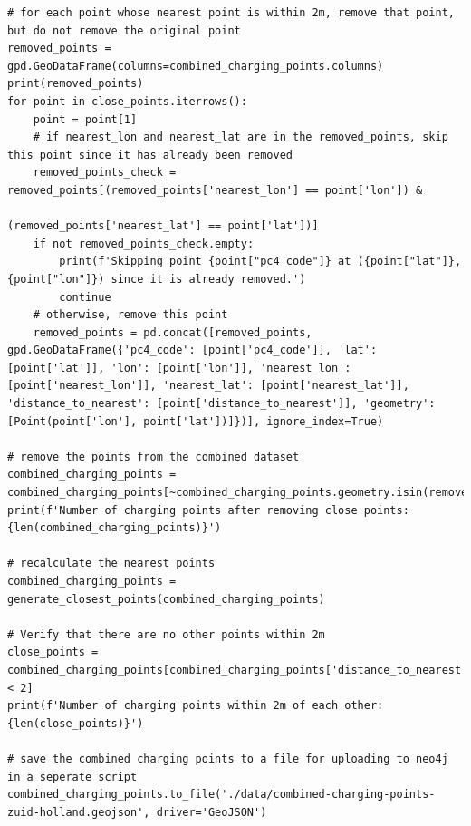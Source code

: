 \documentclass{article}
\begin{document}
\begin{lstlisting}[style=pythonStyle,caption={Code for data exchange between OSM and OCM}, label={lst:data_exchange}]
# for each point whose nearest point is within 2m, remove that point, but do not remove the original point
removed_points = gpd.GeoDataFrame(columns=combined_charging_points.columns)
print(removed_points)
for point in close_points.iterrows():
    point = point[1]
    # if nearest_lon and nearest_lat are in the removed_points, skip this point since it has already been removed
    removed_points_check = removed_points[(removed_points['nearest_lon'] == point['lon']) &
                                         (removed_points['nearest_lat'] == point['lat'])]
    if not removed_points_check.empty:
        print(f'Skipping point {point["pc4_code"]} at ({point["lat"]}, {point["lon"]}) since it is already removed.')
        continue
    # otherwise, remove this point
    removed_points = pd.concat([removed_points, gpd.GeoDataFrame({'pc4_code': [point['pc4_code']], 'lat': [point['lat']], 'lon': [point['lon']], 'nearest_lon': [point['nearest_lon']], 'nearest_lat': [point['nearest_lat']], 'distance_to_nearest': [point['distance_to_nearest']], 'geometry': [Point(point['lon'], point['lat'])]})], ignore_index=True) 

# remove the points from the combined dataset
combined_charging_points = combined_charging_points[~combined_charging_points.geometry.isin(removed_points.geometry)]
print(f'Number of charging points after removing close points: {len(combined_charging_points)}')

# recalculate the nearest points
combined_charging_points = generate_closest_points(combined_charging_points)

# Verify that there are no other points within 2m
close_points = combined_charging_points[combined_charging_points['distance_to_nearest'] < 2]
print(f'Number of charging points within 2m of each other: {len(close_points)}')

# save the combined charging points to a file for uploading to neo4j in a seperate script
combined_charging_points.to_file('./data/combined-charging-points-zuid-holland.geojson', driver='GeoJSON')

\end{lstlisting}
\end{document}
